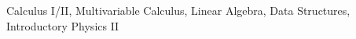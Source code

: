 \documentclass[./Resume.tex]{subfiles}
\begin{document}
	\vspace*{-2mm}
		   \begin{center}
			   Calculus I/II, Multivariable Calculus, Linear Algebra, Data Structures, Introductory Physics II
		   \end{center}
	\vspace*{-2mm}
\end{document}
